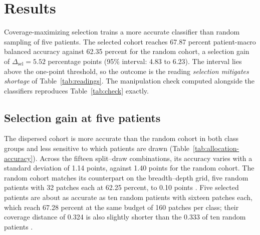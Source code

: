 \section{Results}
\label{sec:results}
Coverage-maximizing selection trains a more accurate classifier than random sampling of five patients. The selected cohort reaches 67.87 percent patient-macro balanced accuracy against 62.35 percent for the random cohort, a selection gain of $\Delta_{\mathrm{sel}}=5.52$ percentage points (95\% interval: 4.83 to 6.23). The interval lies above the one-point threshold, so the outcome is the reading \emph{selection mitigates shortage} of Table~\ref{tab:readings}. The manipulation check computed alongside the classifiers reproduces Table~\ref{tab:check} exactly.

\subsection{Selection gain at five patients}
\label{sec:gain-results}
The dispersed cohort is more accurate than the random cohort in both class groups and less sensitive to which patients are drawn (Table~\ref{tab:allocation-accuracy}). Across the fifteen split--draw combinations, its accuracy varies with a standard deviation of 1.14 points, against 1.40 points for the random cohort. The random cohort matches its counterpart on the breadth--depth grid, five random patients with 32 patches each at 62.25 percent, to 0.10 points \citep{queisler2026effectiveSupport}. Five selected patients are about as accurate as ten random patients with sixteen patches each, which reach 67.28 percent at the same budget of 160 patches per class; their coverage distance of 0.324 is also slightly shorter than the 0.333 of ten random patients \citep{queisler2026coverageRedundancy}.

